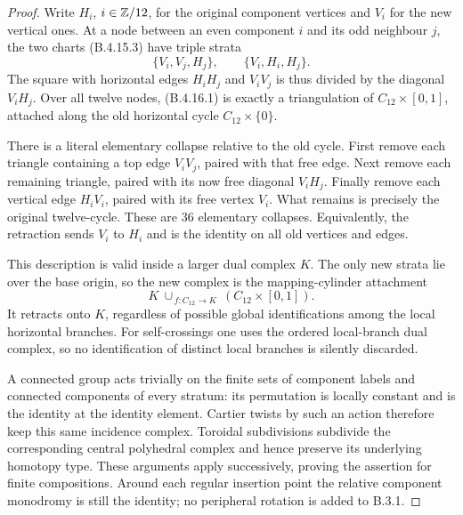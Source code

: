 \begin{proof}
Write $H_i$, $i\in\mathbb Z/12$, for the original component
vertices and $V_i$ for the new vertical ones. At a node
between an even component $i$ and its odd neighbour
$j$, the two charts (B.4.15.3) have triple strata
\[
 \{V_i,V_j,H_j\},\qquad
 \{V_i,H_i,H_j\}.
 \tag{B.4.16.1}
\]
The square with horizontal edges $H_iH_j$ and $V_iV_j$
is thus divided by the diagonal $V_iH_j$. Over all
twelve nodes, (B.4.16.1) is exactly a triangulation of
$C_{12}\times[0,1]$, attached along the old horizontal
cycle $C_{12}\times\{0\}$.

There is a literal elementary collapse relative to the
old cycle. First remove each triangle containing a top
edge $V_iV_j$, paired with that free edge. Next remove
each remaining triangle, paired with its now free
diagonal $V_iH_j$. Finally remove each vertical edge
$H_iV_i$, paired with its free vertex $V_i$. What remains
is precisely the original twelve-cycle. These are
$36$ elementary collapses. Equivalently, the retraction
sends $V_i$ to $H_i$ and is the identity on all old
vertices and edges.

This description is valid inside a larger dual complex
$K$. The only new strata lie over the base origin,
so the new complex is the mapping-cylinder attachment
\[
 K\ \cup_{\,f:C_{12}\to K}\
           (C_{12}\times[0,1]).
\]
It retracts onto $K$, regardless of possible global
identifications among the local horizontal branches.
For self-crossings one uses the ordered local-branch
dual complex, so no identification of distinct local
branches is silently discarded.

A connected group acts trivially on the finite sets
of component labels and connected components of every
stratum: its permutation is locally constant and is
the identity at the identity element. Cartier twists
by such an action therefore keep this same incidence
complex. Toroidal subdivisions subdivide the
corresponding central polyhedral complex and hence
preserve its underlying homotopy type. These arguments
apply successively, proving the assertion for finite
compositions. Around each regular insertion point the
relative component monodromy is still the identity;
no peripheral rotation is added to B.3.1.


\end{proof}
